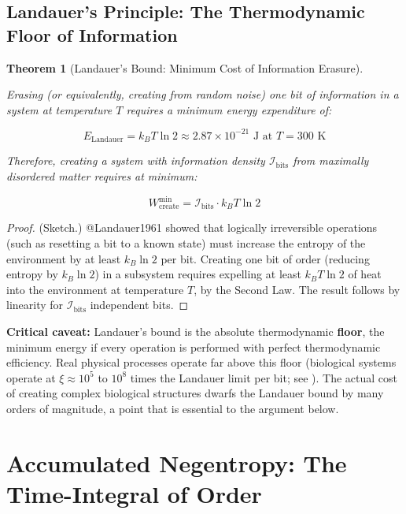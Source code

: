 \documentclass[11pt]{article}
\theoremstyle{plain}
\newtheorem{theorem}{Theorem}
\theoremstyle{definition}
\theoremstyle{remark}
\let\origsection\section
\renewcommand{\section}{\needspace{12\baselineskip}\origsection}
\let\origsubsection\subsection
\renewcommand{\subsection}{\needspace{7\baselineskip}\origsubsection}
\begin{document}
\subsection{Landauer's Principle: The Thermodynamic Floor of
Information}\label{landauers-principle-the-thermodynamic-floor-of-information}

\begin{theorem}[Landauer's Bound: Minimum Cost of Information Erasure]
\label{thm-landauer-bound}

Erasing (or equivalently, creating from random noise) one bit of information in a system at temperature $T$ requires a minimum energy expenditure of:

$$E_{\text{Landauer}} = k_B T \ln 2 \approx 2.87 \times 10^{-21} \text{ J at } T = 300\text{ K}$$

Therefore, creating a system with information density $\mathcal{I}_{\text{bits}}$ from maximally disordered matter requires at minimum:

$$W_{\text{create}}^{\min} = \mathcal{I}_{\text{bits}} \cdot k_B T \ln 2$$
\end{theorem}

\begin{proof}
(Sketch.) @Landauer1961 showed that logically irreversible operations (such as resetting a bit to a known state) must increase the entropy of the environment by at least $k_B \ln 2$ per bit. Creating one bit of order (reducing entropy by $k_B \ln 2$) in a subsystem requires expelling at least $k_B T \ln 2$ of heat into the environment at temperature $T$, by the Second Law. The result follows by linearity for $\mathcal{I}_{\text{bits}}$ independent bits.
\end{proof}

\textbf{Critical caveat:} Landauer's bound is the absolute thermodynamic
\textbf{floor}, the minimum energy if every operation is performed with
perfect thermodynamic efficiency. Real physical processes operate far
above this floor (biological systems operate at \(\xi \approx 10^5\) to
\(10^8\) times the Landauer limit per bit; see \citep{TC-II}). The
actual cost of creating complex biological structures dwarfs the
Landauer bound by many orders of magnitude, a point that is essential to
the argument below.

\section{Accumulated Negentropy: The Time-Integral of
Order}\label{accumulated-negentropy-the-time-integral-of-order}
\end{document}
